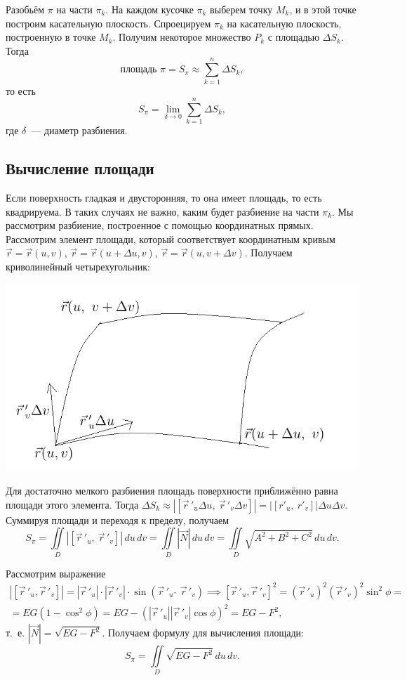 \documentclass[../../main.tex]{subfiles}
\begin{document}
Разобьём $\pi$ на части $\pi_k$. На каждом кусочке $\pi_k$
выберем точку $M_k$, и в этой точке построим касательную 
плоскость. Спроецируем $\pi_k$ на касательную плоскость, построенную в точке $M_k$. Получим некоторое 
множество $P_k$ с площадью $\Delta S_k$. Тогда \[\text{площадь  } \pi = S_\pi 
\approx \sum\limits_{k=1}^n\Delta S_k,\] то есть \[S_\pi = 
\lim\limits_{\delta\rightarrow0}\sum\limits_{k = 1}^n\Delta S_k,\]
где $\delta$~--- диаметр разбиения. 

\subsection{Вычисление площади}

Если поверхность гладкая и двусторонняя, то она имеет площадь, то есть 
квадрируема. В таких случаях не важно, каким будет разбиение на части $\pi_k$. 
Мы рассмотрим разбиение, построенное с помощью координатных прямых. Рассмотрим 
элемент площади, который соответствует координатным кривым
$\vec{r} = \vec{r}(u, v)$, $\vec{r} = 
\vec{r}(u + \Delta u, v)$, $\vec{r} = \vec{r}(u, v + \Delta v)$. Получаем криволинейный четырехугольник:

\begin{center}
\includegraphics[scale = 1]{lec22_2.png}
\end{center}

Для достаточно мелкого разбиения площадь поверхности приближённо равна площади 
этого элемента. Тогда $\Delta S_k \approx \left|\left[\vec r\,'_u\Delta u, \ 
\vec r\,'_v\Delta v\right]\right| = \left|\left[r'_u, \ r'_v\right]\right|\Delta u\Delta v$. 
Суммируя площади и переходя к пределу, получаем
\[S_\pi = \iint\limits_D\left|\left[\vec r\,'_u, \ \vec r\,'_v\right]\right|\,du\,dv = \iint\limits_D|\vec{N}|\,du\,dv = 
\iint\limits_D\sqrt{A^2+B^2+C^2}\,du\,dv.\]

Рассмотрим выражение
\begin{gather*}
\left|\left[\vec r\,'_u, \vec r\,'_v\right]\right| = 
\left|\vec r\,'_u\right|\cdot\left|\vec r\,'_v\right| 
\cdot \sin(\vec r\,'_u \ \hat{\ }\  \vec r\,'_v) \implies
\left[\vec r\,'_u, \vec r\,'_v\right]^2 =
(\vec r\,'_u)^2(\vec r\,'_v)^2\sin^2\phi = \\ = EG(1 
- \cos^2\phi) = EG - (|\vec r\,'_u||\vec r\,'_v|\cos\phi)^2 = EG-F^2,
\end{gather*}
т.~е. $|\vec{N}| = \sqrt{EG - F^2}$. Получаем формулу для вычисления площади:
\[
S_\pi = \iint\limits_D\sqrt{EG - F^2}\,du\,dv.
\]
\end{document}
